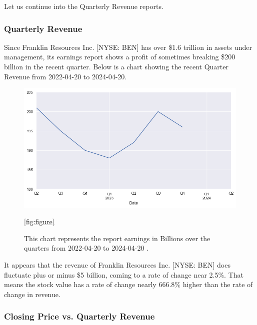 \documentclass[9pt,a4paper,twoside]{tau}
\begin{document}
        Let us continue into the Quarterly Revenue reports.
            
    \subsubsection{Quarterly Revenue}
        
        Since Franklin Resources Inc. [NYSE: BEN] has over \$1.6 trillion in assets under management, its earnings report shows a profit of sometimes breaking \$200 billion in the recent quarter. Below is a chart showing the recent Quarter Revenue from 2022-04-20 to 2024-04-20.
            \begin{figure}[H]
                \centering
                \includegraphics[width=0.85\columnwidth]{Figures/EarningByQt.png}
                \caption{This chart represents the report earnings in Billions over the quarters from 2022-04-20 to 2024-04-20 \cite{alpha-vantage-2024}.}
                \ref{fig:figure}
            \end{figure}
        
        It appears that the revenue of Franklin Resources Inc. [NYSE: BEN] does fluctuate plus or minus \$5 billion, coming to a rate of change near 2.5\%. That means the stock value has a rate of change nearly 666.8\% higher than the rate of change in revenue. 
            
    \subsubsection{Closing Price vs. Quarterly Revenue}   
        
\end{document}
